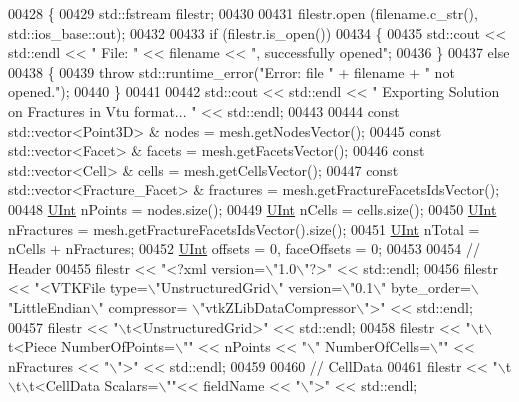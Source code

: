 \begin{DoxyCode}
00428 \{
00429     std::fstream filestr;
00430 
00431     filestr.open (filename.c\_str(), std::ios\_base::out);
00432 
00433     \textcolor{keywordflow}{if} (filestr.is\_open())
00434     \{
00435         std::cout << std::endl << \textcolor{stringliteral}{" File: "} << filename << \textcolor{stringliteral}{", successfully opened"};
00436     \}
00437     \textcolor{keywordflow}{else}
00438     \{
00439         \textcolor{keywordflow}{throw} std::runtime\_error(\textcolor{stringliteral}{"Error: file "} + filename + \textcolor{stringliteral}{" not opened."});
00440     \}
00441 
00442     std::cout << std::endl << \textcolor{stringliteral}{" Exporting Solution on Fractures in Vtu format... "} << std::endl;
00443 
00444     \textcolor{keyword}{const} std::vector<Point3D> & nodes = mesh.getNodesVector();
00445     \textcolor{keyword}{const} std::vector<Facet> & facets = mesh.getFacetsVector();
00446     \textcolor{keyword}{const} std::vector<Cell> & cells = mesh.getCellsVector();
00447     \textcolor{keyword}{const} std::vector<Fracture\_Facet> & fractures = mesh.getFractureFacetsIdsVector();
00448     \hyperlink{namespaceFVCode3D_a4bf7e328c75d0fd504050d040ebe9eda}{UInt} nPoints = nodes.size();
00449     \hyperlink{namespaceFVCode3D_a4bf7e328c75d0fd504050d040ebe9eda}{UInt} nCells = cells.size();
00450     \hyperlink{namespaceFVCode3D_a4bf7e328c75d0fd504050d040ebe9eda}{UInt} nFractures = mesh.getFractureFacetsIdsVector().size();
00451     \hyperlink{namespaceFVCode3D_a4bf7e328c75d0fd504050d040ebe9eda}{UInt} nTotal = nCells + nFractures;
00452     \hyperlink{namespaceFVCode3D_a4bf7e328c75d0fd504050d040ebe9eda}{UInt} offsets = 0, faceOffsets = 0;
00453 
00454     \textcolor{comment}{// Header}
00455     filestr << \textcolor{stringliteral}{"<?xml version=\(\backslash\)"1.0\(\backslash\)"?>"} << std::endl;
00456     filestr << \textcolor{stringliteral}{"<VTKFile type=\(\backslash\)"UnstructuredGrid\(\backslash\)" version=\(\backslash\)"0.1\(\backslash\)" byte\_order=\(\backslash\)"LittleEndian\(\backslash\)" compressor=
      \(\backslash\)"vtkZLibDataCompressor\(\backslash\)">"} << std::endl;
00457     filestr << \textcolor{stringliteral}{"\(\backslash\)t<UnstructuredGrid>"} << std::endl;
00458     filestr << \textcolor{stringliteral}{"\(\backslash\)t\(\backslash\)t<Piece NumberOfPoints=\(\backslash\)""} << nPoints << \textcolor{stringliteral}{"\(\backslash\)" NumberOfCells=\(\backslash\)""} << nFractures << \textcolor{stringliteral}{"\(\backslash\)">"} <<
       std::endl;
00459 
00460     \textcolor{comment}{// CellData}
00461     filestr << \textcolor{stringliteral}{"\(\backslash\)t\(\backslash\)t\(\backslash\)t<CellData Scalars=\(\backslash\)""}<< fieldName << \textcolor{stringliteral}{"\(\backslash\)">"} << std::endl;

\end{DoxyCode}
